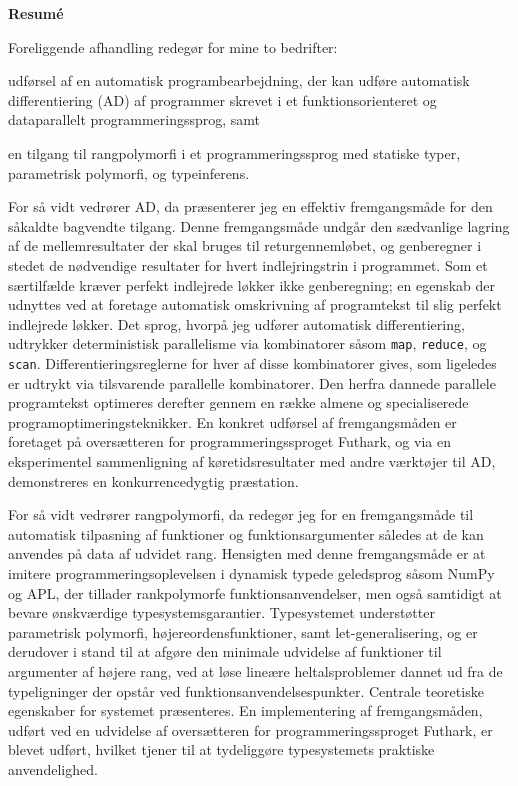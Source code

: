 \newpage
\begin{center}
\textbf{Resum\'e}
\end{center}
Foreliggende afhandling redegør for mine to bedrifter:
\begin{enumerate*}[label=\arabic*)]
\item udførsel af en automatisk programbearbejdning, der kan udføre
  automatisk differentiering (AD) af programmer skrevet i et
  funktionsorienteret og dataparallelt programmeringssprog, samt
\item en tilgang til rangpolymorfi i et programmeringssprog med
  statiske typer, parametrisk polymorfi, og typeinferens.
\end{enumerate*}

For så vidt vedrører AD, da præsenterer jeg en effektiv fremgangsmåde
for den såkaldte bagvendte tilgang. Denne fremgangsmåde undgår den
sædvanlige lagring af de mellemresultater der skal bruges til
returgennemløbet, og genberegner i stedet de nødvendige resultater for
hvert indlejringstrin i programmet. Som et særtilfælde kræver perfekt
indlejrede løkker ikke genberegning; en egenskab der udnyttes ved at
foretage automatisk omskrivning af programtekst til slig perfekt
indlejrede løkker.
%
Det sprog, hvorpå jeg udfører automatisk differentiering, udtrykker
deterministisk parallelisme via kombinatorer såsom \texttt{map},
\texttt{reduce}, og \texttt{scan}. Differentieringsreglerne for hver
af disse kombinatorer gives, som ligeledes er udtrykt via tilsvarende
parallelle kombinatorer. Den herfra dannede parallele programtekst
optimeres derefter gennem en række almene og specialiserede
programoptimeringsteknikker.
%
En konkret udførsel af fremgangsmåden er foretaget på oversætteren for
programmeringssproget Futhark, og via en eksperimentel sammenligning
af køretidsresultater med andre værktøjer til AD, demonstreres en
konkurrencedygtig præstation.

For så vidt vedrører rangpolymorfi, da redegør jeg for en
fremgangsmåde til automatisk tilpasning af funktioner og
funktionsargumenter således at de kan anvendes på data af udvidet
rang. Hensigten med denne fremgangsmåde er at imitere
programmeringsoplevelsen i dynamisk typede geledsprog såsom NumPy og
APL, der tillader rankpolymorfe funktionsanvendelser, men også
samtidigt at bevare ønskværdige typesystemsgarantier. Typesystemet
understøtter parametrisk polymorfi, højereordensfunktioner, samt
let-generalisering, og er derudover i stand til at afgøre den minimale
udvidelse af funktioner til argumenter af højere rang, ved at løse
lineære heltalsproblemer dannet ud fra de typeligninger der opstår ved
funktionsanvendelsespunkter. Centrale teoretiske egenskaber for
systemet præsenteres. En implementering af fremgangsmåden, udført ved
en udvidelse af oversætteren for programmeringssproget Futhark, er
blevet udført, hvilket tjener til at tydeliggøre typesystemets
praktiske anvendelighed.
